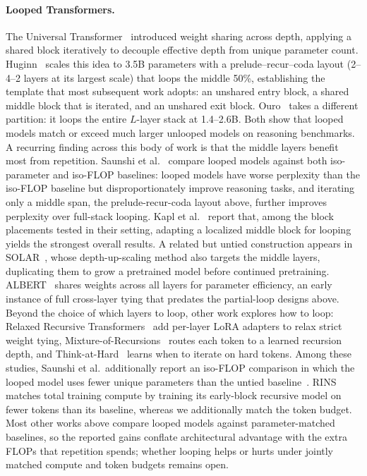 \documentclass[]{bytedance_seed}
\theoremstyle{definition}
\theoremstyle{remark}
\begin{document}
\paragraph{Looped Transformers.}
The Universal Transformer~\cite{dehghani2019universal} introduced weight sharing across depth, applying a shared block iteratively to decouple effective depth from unique parameter count.
%
Huginn~\cite{geiping2025scaling} scales this idea to 3.5B parameters with a prelude--recur--coda layout (2--4--2 layers at its largest scale) that loops the middle 50\%, establishing the template that most subsequent work adopts: an unshared entry block, a shared middle block that is iterated, and an unshared exit block.
%
Ouro~\cite{zhu2025scaling} takes a different partition: it loops the entire $L$-layer stack at 1.4--2.6B.
%
Both show that looped models match or exceed much larger unlooped models on reasoning benchmarks.
%
A recurring finding across this body of work is that the middle layers benefit most from repetition.
%
Saunshi et al.~\cite{saunshi2025reasoning} compare looped models against both iso-parameter and iso-FLOP baselines: looped models have worse perplexity than the iso-FLOP baseline but disproportionately improve reasoning tasks, and iterating only a middle span, the prelude-recur-coda layout above, further improves perplexity over full-stack looping.
%
Kapl et al.~\cite{kapl2026growing} report that, among the block placements tested in their setting, adapting a localized middle block for looping yields the strongest overall results.
%
A related but untied construction appears in SOLAR~\cite{kim2024solar}, whose depth-up-scaling method also targets the middle layers, duplicating them to grow a pretrained model before continued pretraining.
%
ALBERT~\cite{lan2020albert} shares weights across all layers for parameter efficiency, an early instance of full cross-layer tying that predates the partial-loop designs above.
%
Beyond the choice of which layers to loop, other work explores how to loop: Relaxed Recursive Transformers~\cite{bae2025relaxed} add per-layer LoRA adapters to relax strict weight tying, Mixture-of-Recursions~\cite{bae2025mixture} routes each token to a learned recursion depth, and Think-at-Hard~\cite{fu2025think} learns when to iterate on hard tokens.
%
Among these studies, Saunshi et al.\ additionally report an iso-FLOP comparison in which the looped model uses fewer unique parameters than the untied baseline~\cite{saunshi2025reasoning}.
%
RINS~\cite{alabdulmohsin2025recursive} matches total training compute by training its early-block recursive model on fewer tokens than its baseline, whereas we additionally match the token budget.
%
Most other works above compare looped models against parameter-matched baselines, so the reported gains conflate architectural advantage with the extra FLOPs that repetition spends; whether looping helps or hurts under jointly matched compute and token budgets remains open.
%
\end{document}
